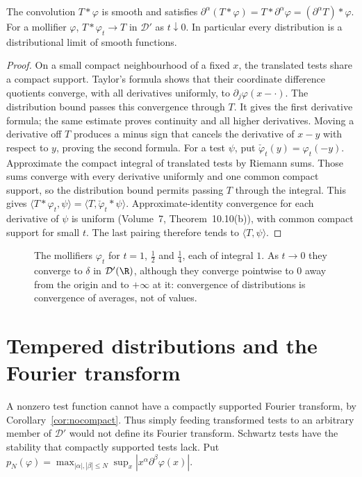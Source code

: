 \begin{proposition}\label{prop:smoothing}
The convolution $T*\varphi$ is smooth and satisfies
$\partial^\alpha(T*\varphi)=T*\partial^\alpha\varphi=(\partial^\alpha T)*\varphi$.
For a mollifier $\varphi$, $T*\varphi_t\to T$ in $\mathcal D'$ as $t\downarrow0$. In particular every distribution is a distributional limit of smooth functions.
\end{proposition}
\begin{proof}
On a small compact neighbourhood of a fixed $x$, the translated tests share a compact support. Taylor's formula shows that their coordinate difference quotients converge, with all derivatives uniformly, to $\partial_j\varphi(x-\cdot)$. The distribution bound passes this convergence through $T$. It gives the first derivative formula; the same estimate proves continuity and all higher derivatives. Moving a derivative off $T$ produces a minus sign that cancels the derivative of $x-y$ with respect to $y$, proving the second formula.
For a test $\psi$, put $\check\varphi_t(y)=\varphi_t(-y)$. Approximate the compact integral of translated tests by Riemann sums. Those sums converge with every derivative uniformly and one common compact support, so the distribution bound permits passing $T$ through the integral. This gives
$\langle T*\varphi_t,\psi\rangle=\langle T,\check\varphi_t*\psi\rangle$.
Approximate-identity convergence for each derivative of $\psi$ is uniform (Volume~7, Theorem~10.10(b)), with common compact support for small $t$. The last pairing therefore tends to $\langle T,\psi\rangle$.
\end{proof}

\begin{figure}[ht]
\centering
{}
\caption{The mollifiers $\varphi_t$ for $t=1$, $\frac12$ and $\frac14$, each of integral $1$. As $t\to0$ they converge to $\delta$ in $\mathcal D'(\R)$, although they converge pointwise to $0$ away from the origin and to
$+\infty$ at it: convergence of distributions is convergence of averages, not of values.}
\label{fig:dirac}
\end{figure}

\section{Tempered distributions and the Fourier transform}

A nonzero test function cannot have a compactly supported Fourier transform, by Corollary~\ref{cor:nocompact}. Thus simply feeding transformed tests to an arbitrary member of $\mathcal D'$ would not define its Fourier transform. Schwartz tests have the stability that compactly supported tests lack. Put
$p_N(\varphi)=\max_{|\alpha|,|\beta|\le N}\sup_x|x^\alpha\partial^\beta\varphi(x)|$.


